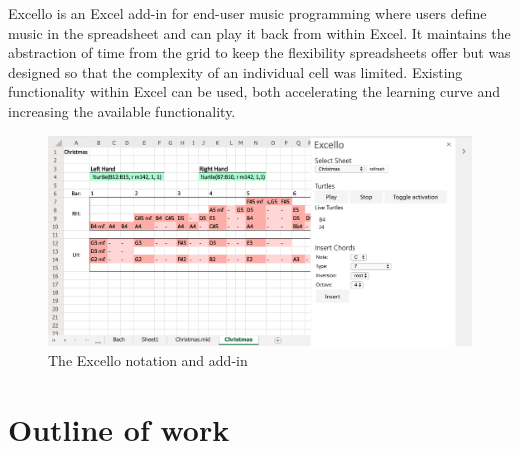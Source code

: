 Excello is an Excel add-in for end-user music programming where users define music in the spreadsheet and can play it back from within Excel. It maintains the abstraction of time from the grid to keep the flexibility spreadsheets offer but was designed so that the complexity of an individual cell was limited. Existing functionality within Excel can be used, both accelerating the learning curve and increasing the available functionality.

\begin{figure}[tbh]
\centerline{\includegraphics[width=150mm]{figs/excello.png}}
\caption{The Excello notation and add-in}
\label{intro:excello}
\end{figure}

\section{Outline of work}

